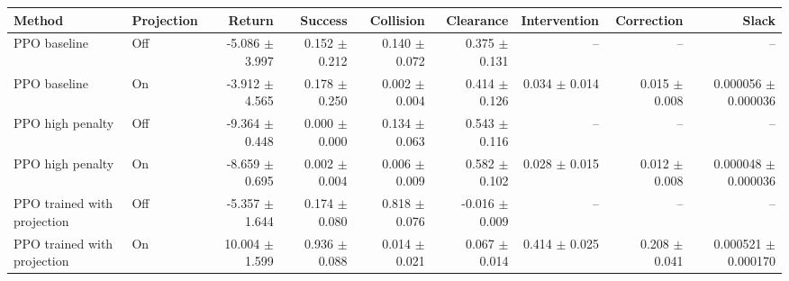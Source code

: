 \begin{tabular}{llrrrrrrr}
\toprule
Method & Projection & Return & Success & Collision & Clearance & Intervention & Correction & Slack \\
\midrule
PPO baseline & Off & -5.086 $\pm$ 3.997 & 0.152 $\pm$ 0.212 & 0.140 $\pm$ 0.072 & 0.375 $\pm$ 0.131 & -- & -- & -- \\
PPO baseline & On & -3.912 $\pm$ 4.565 & 0.178 $\pm$ 0.250 & 0.002 $\pm$ 0.004 & 0.414 $\pm$ 0.126 & 0.034 $\pm$ 0.014 & 0.015 $\pm$ 0.008 & 0.000056 $\pm$ 0.000036 \\
PPO high penalty & Off & -9.364 $\pm$ 0.448 & 0.000 $\pm$ 0.000 & 0.134 $\pm$ 0.063 & 0.543 $\pm$ 0.116 & -- & -- & -- \\
PPO high penalty & On & -8.659 $\pm$ 0.695 & 0.002 $\pm$ 0.004 & 0.006 $\pm$ 0.009 & 0.582 $\pm$ 0.102 & 0.028 $\pm$ 0.015 & 0.012 $\pm$ 0.008 & 0.000048 $\pm$ 0.000036 \\
PPO trained with projection & Off & -5.357 $\pm$ 1.644 & 0.174 $\pm$ 0.080 & 0.818 $\pm$ 0.076 & -0.016 $\pm$ 0.009 & -- & -- & -- \\
PPO trained with projection & On & 10.004 $\pm$ 1.599 & 0.936 $\pm$ 0.088 & 0.014 $\pm$ 0.021 & 0.067 $\pm$ 0.014 & 0.414 $\pm$ 0.025 & 0.208 $\pm$ 0.041 & 0.000521 $\pm$ 0.000170 \\
\bottomrule
\end{tabular}
